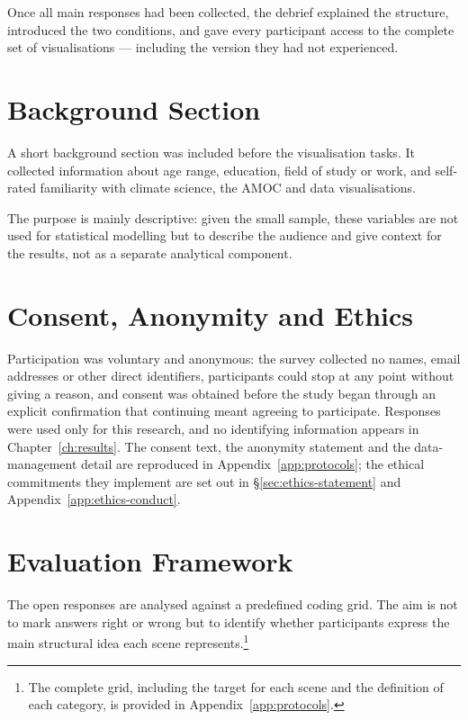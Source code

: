 Once all main responses had been collected, the debrief explained the structure, introduced the two conditions, and gave every participant access to the complete set of visualisations --- including the version they had not experienced.

\section{Background Section}
\label{sec:eval-demographics}

A short background section was included before the visualisation tasks. It collected information about age range, education, field of study or work, and self-rated familiarity with climate science, the AMOC and data visualisations.

The purpose is mainly descriptive: given the small sample, these variables are not used for statistical modelling but to describe the audience and give context for the results, not as a separate analytical component.

\section{Consent, Anonymity and Ethics}
\label{sec:eval-ethics}

Participation was voluntary and anonymous: the survey collected no names, email addresses or other direct identifiers, participants could stop at any point without giving a reason, and consent was obtained before the study began through an explicit confirmation that continuing meant agreeing to participate. Responses were used only for this research, and no identifying information appears in Chapter~\ref{ch:results}. The consent text, the anonymity statement and the data-management detail are reproduced in Appendix~\ref{app:protocols}; the ethical commitments they implement are set out in \S\ref{sec:ethics-statement} and Appendix~\ref{app:ethics-conduct}.

\section{Evaluation Framework}
\label{sec:eval-framework}

The open responses are analysed against a predefined coding grid. The aim is not to mark answers right or wrong but to identify whether participants express the main structural idea each scene represents.\footnote{The complete grid, including the target for each scene and the definition of each category, is provided in Appendix~\ref{app:protocols}.}

